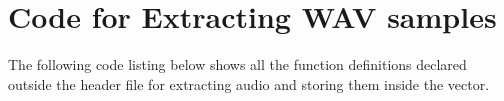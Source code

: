 \section{Code for Extracting WAV samples}
\label{app:wav-streaming}

The following code listing below shows all the function definitions
declared outside the header file for extracting audio and storing
them inside the vector.


